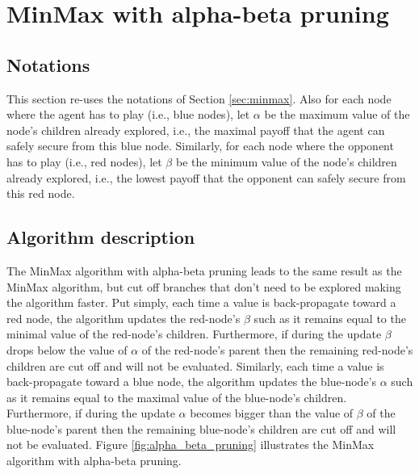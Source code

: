 \documentclass[11pt,fleqn]{book} %
\begin{document}
\section{MinMax with alpha-beta pruning}

\subsection*{Notations}

This section re-uses the notations of Section \ref{sec:minmax}. Also for each node where the agent has to play (i.e., blue nodes), let $\alpha$ be the maximum value of the node's children already explored, i.e., the maximal payoff that the agent can safely secure from this blue node. Similarly, for each node where the opponent has to play (i.e., red nodes), let $\beta$ be the minimum value of the node's children already explored, i.e., the lowest payoff that the opponent can safely secure from this red node.

\subsection*{Algorithm description}

The MinMax algorithm with alpha-beta pruning leads to the same result as the MinMax algorithm, but cut off branches that don't need to be explored making the algorithm faster. Put simply, each time a value is back-propagate toward a red node, the algorithm updates the red-node's $\beta$ such as it remains equal to the minimal value of the red-node's children. Furthermore, if during the update $\beta$ drops below the value of $\alpha$ of the red-node's parent then the remaining red-node's children are cut off and will not be evaluated. Similarly, each time a value is back-propagate toward a blue node, the algorithm updates the blue-node's $\alpha$ such as it remains equal to the maximal value of the blue-node's children. Furthermore, if during the update $\alpha$ becomes bigger than the value of $\beta$ of the blue-node's parent then the remaining blue-node's children are cut off and will not be evaluated. Figure \ref{fig:alpha_beta_pruning} illustrates the MinMax algorithm with alpha-beta pruning.
\end{document}
